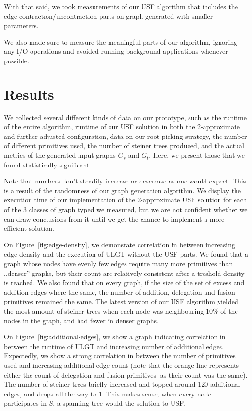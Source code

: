 \documentclass{article}
\begin{document}
With that said, we took measurements of our USF algorithm that includes the edge contraction/uncontraction parts on graph generated with smaller parameters.

We also made sure to measure the meaningful parts of our algorithm, ignoring any I/O operations and avoided running background applications whenever possible.

\section{Results}
\label{sec:results}

We collected several different kinds of data on our prototype, such as the runtime of the entire algorithm, runtime of our USF solution in both the 2-approximate and further adjusted configuration, data on our root picking strategy, the number of different primitives used, the number of steiner trees produced, and the actual metrics of the generated input graphs $G_s$ and $G_t$. Here, we present those that we found statistically significant.

Note that numbers don't steadily increase or descrease as one would expect. This is a result of the randomness of our graph generation algorithm. We display the execution time of our implementation of the 2-approximate USF solution for each of the 3 classes of graph typed we measured, but we are not confident whether we can draw conclusions from it until we get the chance to implement a more efficient solution.

On Figure~\ref{fig:edge-density}, we demonstate correlation in between increasing edge density and the execution of ULGT without the USF parts. We found that a graph whose nodes have evenly few edges require many more primitives than ,,denser'' graphs, but their count are relatively consistent after a treshold density is reached. We also found that on every graph, if the size of the set of excess and addition edges where the same, the number of addition, delegation and fusion primitives remained the same. The latest version of our USF algorithm yielded the most amount of steiner trees when each node was neighbouring 10\% of the nodes in the graph, and had fewer in denser graphs.

On Figure~\ref{fig:additional-edges}, we show a graph indicating correlation in between the runtime of ULGT and increasing number of additional edges. Expectedly, we show a strong correlation in between the number of primitives used and increasing additional edge count (note that the orange line represents either the count of delegation and fusion primitives, as their count was the same). The number of steiner trees briefly increased and topped around 120 additional edges, and drops all the way to 1. This makes sense; when every node participates in $S$, a spanning tree would the solution to USF.
\end{document}
